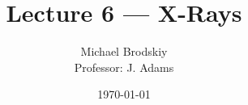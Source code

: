 


\title{Lecture 6 — X-Rays}
\date{\today}
\author{Michael Brodskiy\\ \small Professor: J. Adams}



\maketitle

